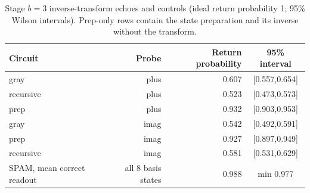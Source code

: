 \begin{table}[htbp]\centering\small
\caption{Stage $b=3$ inverse-transform echoes and controls (ideal return probability 1; 95\% Wilson intervals). Prep-only rows contain the state preparation and its inverse without the transform.}
\label{tab:hw-echo-b3}\begin{tabular}{lrrc}\toprule Circuit & Probe & Return probability & 95\% interval\\\midrule
gray & plus & 0.607 & [0.557,0.654]\\
recursive & plus & 0.523 & [0.473,0.573]\\
prep & plus & 0.932 & [0.903,0.953]\\
gray & imag & 0.542 & [0.492,0.591]\\
prep & imag & 0.927 & [0.897,0.949]\\
recursive & imag & 0.581 & [0.531,0.629]\\
\midrule
SPAM, mean correct readout & all 8 basis states & 0.988 & min 0.977\\
\bottomrule\end{tabular}\end{table}
